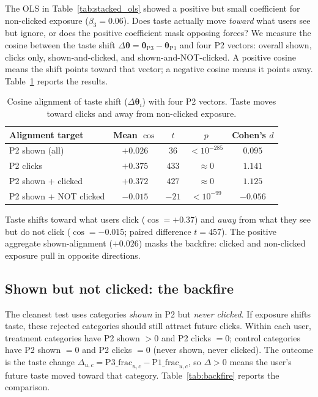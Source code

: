 \documentclass[11pt]{article}
\begin{document}
The OLS in Table~\ref{tab:stacked_ols} showed a positive but small coefficient for non-clicked exposure ($\beta_3 = 0.06$). Does taste actually move \emph{toward} what users see but ignore, or does the positive coefficient mask opposing forces? We measure the cosine between the taste shift $\Delta\boldsymbol{\theta} = \boldsymbol{\theta}_{\text{P3}} - \boldsymbol{\theta}_{\text{P1}}$ and four P2 vectors: overall shown, clicks only, shown-and-clicked, and shown-and-NOT-clicked. A positive cosine means the shift points toward that vector; a negative cosine means it points away. Table~\ref{tab:cosine_alignment} reports the results.

\begin{table}[ht]
\centering
\caption{Cosine alignment of taste shift ($\Delta\boldsymbol{\theta}_i$) with four P2 vectors. Taste moves toward clicks and away from non-clicked exposure.}
\label{tab:cosine_alignment}
\begin{tabular}{lcccc}
\toprule
Alignment target & Mean $\cos$ & $t$ & $p$ & Cohen's $d$ \\
\midrule
P2 shown (all) & $+0.026$ & $36$ & $< 10^{-285}$ & $0.095$ \\
P2 clicks & $+0.375$ & $433$ & $\approx 0$ & $1.141$ \\
P2 shown + clicked & $+0.372$ & $427$ & $\approx 0$ & $1.125$ \\
P2 shown + NOT clicked & $\mathbf{-0.015}$ & $-21$ & $< 10^{-99}$ & $-0.056$ \\
\bottomrule
\end{tabular}
\end{table}
\FloatBarrier

Taste shifts toward what users click ($\cos = +0.37$) and \emph{away} from what they see but do not click ($\cos = -0.015$; paired difference $t = 457$). The positive aggregate shown-alignment ($+0.026$) masks the backfire: clicked and non-clicked exposure pull in opposite directions.

\subsection{Shown but not clicked: the backfire}
\label{sec:shown_not_clicked}

The cleanest test uses categories \emph{shown} in P2 but \emph{never clicked}. If exposure shifts taste, these rejected categories should still attract future clicks. Within each user, treatment categories have P2 shown $> 0$ and P2 clicks $= 0$; control categories have P2 shown $= 0$ and P2 clicks $= 0$ (never shown, never clicked). The outcome is the taste change $\Delta_{u,c} = \text{P3\_frac}_{u,c} - \text{P1\_frac}_{u,c}$, so $\Delta > 0$ means the user's future taste moved toward that category. Table~\ref{tab:backfire} reports the comparison.
\end{document}
